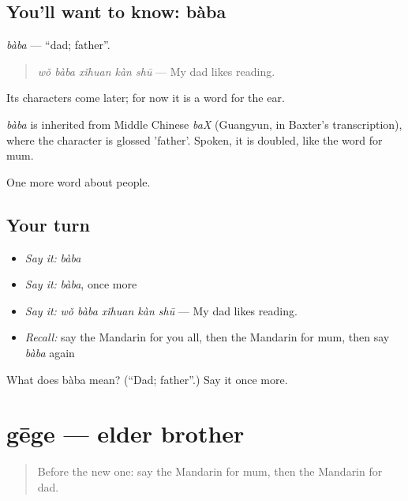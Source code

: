 \subsection*{You'll want to know: bàba}
\emph{bàba} — \textquotedblleft{}dad; father\textquotedblright{}.

\begin{quote}
\emph{wǒ bàba xǐhuan kàn shū} — My dad likes reading.
\end{quote}

Its characters come later; for now it is a word for the ear.

\begin{cousinweb}
\emph{bàba} is inherited from Middle Chinese \emph{baX} (Guangyun, in Baxter's transcription), where the character is glossed 'father'. Spoken, it is doubled, like the word for mum.
\end{cousinweb}

\begin{grammarlens}[title={What you've built}]
One more word about people.
\end{grammarlens}

\subsection*{Your turn}
\begin{itemize}
\raggedright
  \item \emph{Say it:} \emph{bàba}
  \item \emph{Say it:} \emph{bàba}, once more
  \item \emph{Say it:} \emph{wǒ bàba xǐhuan kàn shū} — My dad likes reading.
  \item \emph{Recall:} say the Mandarin for you all, then the Mandarin for mum, then say \emph{bàba} again
\end{itemize}

\begin{tcolorbox}[breakable,colback=teal!4,colframe=teal!35!black,title={Before you move on}]
What does bàba mean? (\textquotedblleft{}Dad; father\textquotedblright{}.) Say it once more.
\end{tcolorbox}
\section[gēge]{gēge — elder brother}

\label{lesson:ZH-C32-gege}



\begin{quote}
Before the new one: say the Mandarin for mum, then the Mandarin for dad.
\end{quote}

